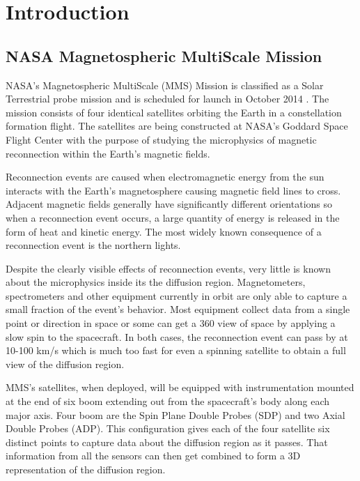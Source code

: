 

\chapter{Introduction}
\label{chap:Introduction}

\section{NASA Magnetospheric MultiScale Mission}
\label{sec:NASAMagnetosphericMultiScaleMission}

NASA's Magnetospheric MultiScale (MMS) Mission is classified as a Solar Terrestrial probe mission and is scheduled for launch in October 2014 \cite{mms_website}.  The mission consists of four identical satellites orbiting the Earth in a constellation formation flight.  The satellites are being constructed at NASA's Goddard Space Flight Center with the purpose of studying the microphysics of magnetic reconnection within the Earth's magnetic fields.


Reconnection events are caused when electromagnetic energy from the sun interacts with the Earth's magnetosphere causing magnetic field lines to cross.  Adjacent magnetic fields generally have significantly different orientations so when a reconnection event occurs, a large quantity of energy is released in the form of heat and kinetic energy.  The most widely known consequence of a reconnection event is the northern lights.

Despite the clearly visible effects of reconnection events, very little is known about the microphysics inside its the diffusion region.  Magnetometers, spectrometers and other equipment currently in orbit are only able to capture a small fraction of the event's behavior.  Most equipment collect data from a single point or direction in space or some can get a 360 view of space by applying a slow spin to the spacecraft.  In both cases, the reconnection event can pass by at 10-100 km/s which is much too fast for even a spinning satellite to obtain a full view of the diffusion region.

MMS's satellites, when deployed, will be equipped with instrumentation mounted at the end of six boom extending out from the spacecraft's body along each major axis.  Four boom are the Spin Plane Double Probes (SDP) and two Axial Double Probes (ADP).  This configuration gives each of the four satellite six distinct points to capture data about the diffusion region as it passes.  That information from all the sensors can then get combined to form a 3D representation of the diffusion region.

